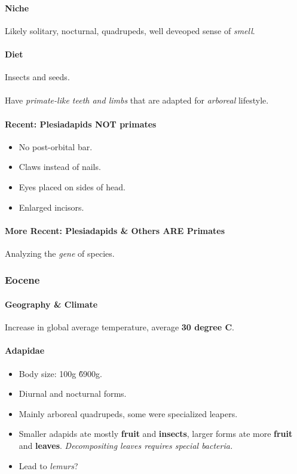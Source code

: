 \documentclass{article}
\begin{document}
	\paragraph{Niche} Likely solitary, nocturnal, quadrupeds, well deveoped sense of \emph{smell}.
	\paragraph{Diet} Insects and seeds.
	\paragraph{} Have \emph{primate-like teeth and limbs} that are adapted for \emph{arboreal} lifestyle.  
	\paragraph{Recent: Plesiadapids NOT primates}
		\begin{itemize}
			\item No post-orbital bar.
			\item Claws instead of nails.
			\item Eyes placed on sides of head.
			\item Enlarged incisors.
		\end{itemize}
	\paragraph{More Recent: Plesiadapids \& Others ARE Primates} Analyzing the \emph{gene} of species.

\subsubsection{Eocene}
	\paragraph{Geography \& Climate} Increase in global average temperature, average \textbf{30 degree C}.
	\paragraph{Adapidae}
	\begin{itemize}
		\item Body size: 100g \~ 6900g.
		\item Diurnal and nocturnal forms.
		\item Mainly arboreal quadrupeds, some were specialized leapers.
		\item Smaller adapids ate mostly \textbf{fruit} and \textbf{insects}, larger forms ate more \textbf{fruit} and \textbf{leaves}. \emph{Decompositing leaves requires special bacteria.}
		\item Lead to \emph{lemurs}?
	\end{itemize}
\end{document}

